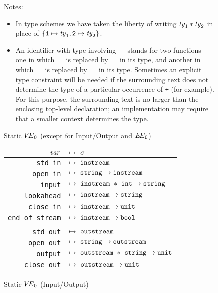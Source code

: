 \begin{figure}
Notes:
\begin{itemize}
\item In type schemes we have taken the liberty of writing
${\it ty}_1\ast{\it ty}_2$ in place of
$\{\mbox{\tt 1}\mapsto{\it ty}_1,\mbox{\tt 2}\mapsto{\it ty}_2\}$.

\item  An identifier with type involving ~\NUM~ stands for two functions --
one in which ~\NUM~ is replaced by ~\INT~ in its type,
and another in which ~\NUM~ is replaced by ~\REAL~ in its type. 
Sometimes an explicit type constraint will be needed if the
surrounding text does not determine the type of a particular
occurrence of \verb-+- (for example). For this purpose, the
surrounding text is no larger than the enclosing top-level
declaration; an implementation may require that a smaller
context determines the type.
\end{itemize}
\caption{Static $\mbox{$V\!E$}_0$ (except for Input/Output and $\mbox{$E\!E$}_0$)}
\label{stat-ve}
\end{figure}
 
\begin{figure}
\begin{center}
\begin{tabular}{|rl|}
\hline
${\it var}$            & $\mapsto\ \tych$\\
\hline
{\tt std\_in}     & $\mapsto\ \INSTREAM$\\
{\tt open\_in}    & $\mapsto\ \STRING\to\INSTREAM$\\
{\tt input}       & $\mapsto\ \INSTREAM\ \ast\ \INT\to\STRING$\\
{\tt lookahead}   & $\mapsto\ \INSTREAM\to\STRING$\\
{\tt close\_in}   & $\mapsto\ \INSTREAM\to\UNIT$\\
{\tt end\_of\_stream}
                  & $\mapsto\ \INSTREAM\to\BOOL$\\
\multicolumn{2}{|c|}{}\\
{\tt std\_out}    & $\mapsto\ \OUTSTREAM$\\
{\tt open\_out}   & $\mapsto\ \STRING\to\OUTSTREAM$\\
{\tt output}      & $\mapsto\ \OUTSTREAM\ \ast\ \STRING\to\UNIT$\\
{\tt close\_out}  & $\mapsto\ \OUTSTREAM\to\UNIT$\\
\hline
\end{tabular}
\end{center}
\vspace{3pt}
\caption{Static $\mbox{$V\!E$}_0$ (Input/Output)}
\label{stat-veio}
\end{figure}
 
